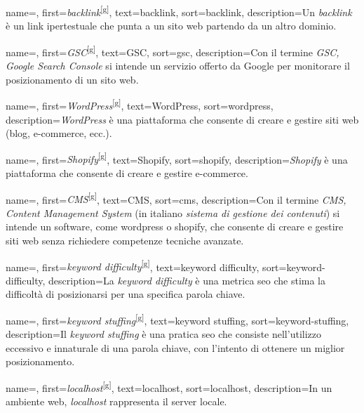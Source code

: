  {
    name=,
    first={\textit{backlink}\textsuperscript{[g]}},
    text=backlink,
    sort=backlink,
    description={Un \textit{backlink} è un link ipertestuale che punta a un sito web partendo da un altro dominio.}
}

 {
    name=,
    first={\textit{GSC}\textsuperscript{[g]}},
    text=GSC,
    sort=gsc,
    description={Con il termine \textit{GSC, Google Search Console} si intende un servizio offerto da Google per monitorare il posizionamento di un sito web.}
}

 {
    name=,
    first={\textit{WordPress}\textsuperscript{[g]}},
    text=WordPress,
    sort=wordpress,
    description={\textit{WordPress} è una piattaforma che consente di creare e gestire siti web (blog, e-commerce, ecc.).}
}

 {
    name=,
    first={\textit{Shopify}\textsuperscript{[g]}},
    text=Shopify,
    sort=shopify,
    description={\textit{Shopify} è una piattaforma che consente di creare e gestire e-commerce.}
}

 {
    name=,
    first={\textit{CMS}\textsuperscript{[g]}},
    text=CMS,
    sort=cms,
    description={Con il termine \textit{CMS, Content Management System} (in italiano \textit{sistema di gestione dei contenuti}) si intende un software, come \gls{wordpress} o \gls{shopify}, che consente di creare e gestire siti web senza richiedere competenze tecniche avanzate.}
}

 {
    name=,
    first={\textit{keyword difficulty}\textsuperscript{[g]}},
    text=keyword difficulty,
    sort=keyword-difficulty,
    description={La \textit{keyword difficulty} è una metrica \gls{seo} che stima la difficoltà di posizionarsi per una specifica parola chiave.}
}

 {
    name=,
    first={\textit{keyword stuffing}\textsuperscript{[g]}},
    text=keyword stuffing,
    sort=keyword-stuffing,
    description={Il \textit{keyword stuffing} è una pratica \gls{seo} che consiste nell'utilizzo eccessivo e innaturale di una parola chiave, con l'intento di ottenere un miglior posizionamento.}
}

 {
    name=,
    first={\textit{localhost}\textsuperscript{[g]}},
    text=localhost,
    sort=localhost,
    description={In un ambiente web, \textit{localhost} rappresenta il server locale.}
}

